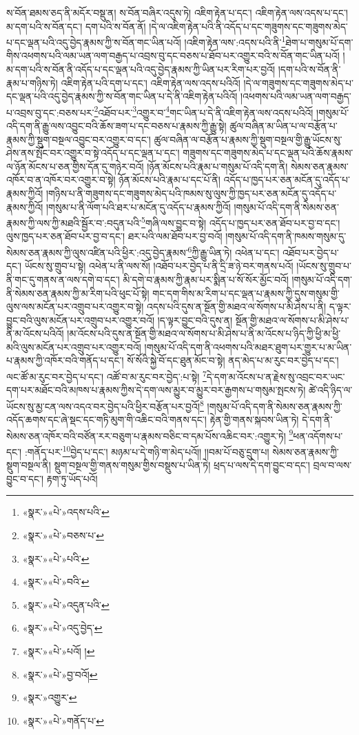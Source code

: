 ས་བོན་ཐམས་ཅད་ནི་མདོར་བསྡུ་ན། ས་བོན་བཞིར་འདུས་ཏེ། འཇིག་རྟེན་པ་དང་། འཇིག་རྟེན་ལས་འདས་པ་དང་། མ་དག་པའི་ས་བོན་དང་། དག་པའི་ས་བོན་ནོ། །དེ་ལ་འཇིག་རྟེན་པའི་ནི་འདོད་པ་དང་གཟུགས་དང་གཟུགས་མེད་པ་དང་ལྡན་པའི་འདུ་བྱེད་རྣམས་ཀྱི་ས་བོན་གང་ཡིན་པའོ། །འཇིག་རྟེན་ལས་:འདས་པའི་ནི་\footnote{«སྣར་»«པེ་»འདས་པའི་}ཐེག་པ་གསུམ་པོ་དག་གིས་འཕགས་པའི་ལམ་ཡན་ལག་བརྒྱད་པ་འབྲས་བུ་དང་བཅས་པ་ཐོབ་པར་འགྱུར་བའི་ས་བོན་གང་ཡིན་པའོ། །མ་དག་པའི་ས་བོན་ནི་འདོད་པ་དང་ལྡན་པའི་འདུ་བྱེད་རྣམས་ཀྱི་ཡིན་པར་རིག་པར་བྱའོ། །དག་པའི་ས་བོན་ནི་རྣམ་པ་གཉིས་ཏེ། འཇིག་རྟེན་པའི་དག་པ་དང་། འཇིག་རྟེན་ལས་འདས་པའིའོ། །དེ་ལ་གཟུགས་དང་གཟུགས་མེད་པ་དང་ལྡན་པའི་འདུ་བྱེད་རྣམས་ཀྱི་ས་བོན་གང་ཡིན་པ་དེ་ནི་འཇིག་རྟེན་པའིའོ། །འཕགས་པའི་ལམ་ཡན་ལག་བརྒྱད་པ་འབྲས་བུ་དང་:བཅས་པར་\footnote{«སྣར་»«པེ་»བཅས་པ་}འཐོབ་པར་\footnote{«སྣར་»«པེ་»པའི་}འགྱུར་བ་\footnote{«སྣར་»«པེ་»བའི་}གང་ཡིན་པ་དེ་ནི་འཇིག་རྟེན་ལས་འདས་པའིའོ། །གསུམ་པོ་འདི་དག་ནི་རྒྱུ་ལས་འབྱུང་བའི་ཆོས་ཟག་པ་དང་བཅས་པ་རྣམས་ཀྱི་རྒྱུ་སྟེ། ཚུལ་བཞིན་མ་ཡིན་པ་ལ་བརྩོན་པ་རྣམས་ཀྱི་སྡུག་བསྔལ་འབྱུང་བར་འགྱུར་བ་དང་། ཚུལ་བཞིན་ལ་བརྩོན་པ་རྣམས་ཀྱི་སྡུག་བསྔལ་གྱི་རྒྱུ་ཡོངས་སུ་ཤེས་ནས་སྤོང་བར་འགྱུར་བ་སྟེ་འདོད་པ་དང་ལྡན་པ་དང་། གཟུགས་དང་གཟུགས་མེད་པ་དང་ལྡན་པའི་ཆོས་རྣམས་ལ་ཉོན་མོངས་པ་ཅན་གྱིས་དོན་དུ་གཉེར་བའོ། །ཉོན་མོངས་པའི་རྣམ་པ་གསུམ་པོ་འདི་དག་ནི། སེམས་ཅན་རྣམས་འཁོར་བ་ན་འཁོར་བར་འགྱུར་བ་སྟེ། ཉོན་མོངས་པའི་རྣམ་པ་དང་པོ་ནི། འདོད་པ་ཁྱད་པར་ཅན་མངོན་དུ་འདོད་པ་རྣམས་ཀྱིའོ། །གཉིས་པ་ནི་གཟུགས་དང་གཟུགས་མེད་པའི་ཁམས་སུ་ལུས་ཀྱི་ཁྱད་པར་ཅན་མངོན་དུ་འདོད་པ་རྣམས་ཀྱིའོ། །གསུམ་པ་ནི་ལོག་པའི་ཐར་པ་མངོན་དུ་འདོད་པ་རྣམས་ཀྱིའོ། །གསུམ་པོ་འདི་དག་ནི་སེམས་ཅན་རྣམས་ཀྱི་ལས་ཀྱི་མཐའི་སྦྱོར་བ་:བདུན་པའི་\footnote{«སྣར་»«པེ་»འདུན་པའི་}གཞི་ལས་བྱུང་བ་སྟེ། འདོད་པ་ཁྱད་པར་ཅན་ཐོབ་པར་བྱ་བ་དང་། ལུས་ཁྱད་པར་ཅན་ཐོབ་པར་བྱ་བ་དང་། ཐར་པའི་ལམ་ཐོབ་པར་བྱ་བའོ། །གསུམ་པོ་འདི་དག་ནི་ཁམས་གསུམ་དུ་སེམས་ཅན་རྣམས་ཀྱི་ལུས་འཛིན་པའི་ཕྱིར་:འདུ་བྱེད་རྣམས་\footnote{«སྣར་»«པེ་»འདུ་བྱེད་}ཀྱི་རྒྱུ་ཡིན་ཏེ། འཕེན་པ་དང་། འཐོབ་པར་བྱེད་པ་དང་། ཡོངས་སུ་གྲུབ་པ་སྟེ། འཕེན་པ་ནི་ལས་སོ། །འཐོབ་པར་བྱེད་པ་ནི་དྲི་ཟ་ཉེ་བར་གནས་པའོ། །ཡོངས་སུ་གྲུབ་པ་ནི་གང་དུ་གནས་ན་ལས་དགེ་བ་དང་། མི་དགེ་བ་རྣམས་ཀྱི་རྣམ་པར་སྨིན་པ་སོ་སོར་མྱོང་བའོ། །གསུམ་པོ་འདི་དག་ནི་སེམས་ཅན་རྣམས་ཀྱི་མ་རིག་པའི་ཕུང་པོ་སྟེ། གང་དག་གིས་མ་རིག་པ་དང་ལྡན་པ་རྣམས་ཀྱི་དུས་གསུམ་གྱི་ལུས་ལས་མངོན་པར་འགྲུབ་པར་འགྱུར་བ་སྟེ། འདས་པའི་དུས་ན་སྔོན་གྱི་མཐའ་ལ་སོགས་པ་མི་ཤེས་པ་ནི། ད་ལྟར་བྱུང་བའི་ལུས་མངོན་པར་འགྲུབ་པར་འགྱུར་བའོ། །ད་ལྟར་བྱུང་བའི་དུས་ན། སྔོན་གྱི་མཐའ་ལ་སོགས་པ་མི་ཤེས་པ་ནི་མ་འོངས་པའིའོ། །མ་འོངས་པའི་དུས་ན་སྔོན་གྱི་མཐའ་ལ་སོགས་པ་མི་ཤེས་པ་ནི་མ་འོངས་པ་ཉིད་ཀྱི་ཕྱི་མ་ཕྱི་མའི་ལུས་མངོན་པར་འགྲུབ་པར་འགྱུར་བའོ། །གསུམ་པོ་འདི་དག་ནི་འཕགས་པའི་མཐར་ཐུག་པར་གྱུར་པ་མ་ཡིན་པ་རྣམས་ཀྱི་འཁོར་བའི་གནོད་པ་དང་། སོ་སོའི་སྐྱེ་བོ་དང་ཐུན་མོང་བ་སྟེ། ནད་མེད་པ་མ་རུང་བར་བྱེད་པ་དང་། ལང་ཚོ་མ་རུང་བར་བྱེད་པ་དང་། འཚོ་བ་མ་རུང་བར་བྱེད་:པ་སྟེ། \footnote{«སྣར་»«པེ་»པའོ། ། }དེ་དག་མ་འོངས་པ་ན་རྗེས་སུ་འབྲང་བར་ཡང་དག་པར་མཐོང་བའི་མཁས་པ་རྣམས་ཀྱིས་དེ་དག་ལས་མྱུར་བ་མྱུར་བར་རྒྱགས་པ་གསུམ་སྤངས་ཏེ། ཚེ་འདི་ཉིད་ལ་ཡོངས་སུ་མྱ་ངན་ལས་འདའ་བར་བྱེད་པའི་ཕྱིར་བརྩོན་པར་བྱའོ།\footnote{«སྣར་»«པེ་»བྱ་བའོ།} །གསུམ་པོ་འདི་དག་ནི་སེམས་ཅན་རྣམས་ཀྱི་འདོད་ཆགས་དང་ཞེ་སྡང་དང་གཏི་མུག་གི་འཆིང་བའི་གནས་དང་། རྟེན་གྱི་གནས་སྐབས་ཡིན་ཏེ། དེ་དག་ནི་སེམས་ཅན་འཁོར་བའི་བཙོན་རར་བཅུག་པ་རྣམས་བཅིང་བ་དམ་པོས་འཆིང་བར་:འགྱུར་ཏེ། \footnote{«སྣར་»འགྱུར་}ཕན་འདོགས་པ་དང་། :གནོད་པར་\footnote{«སྣར་»«པེ་»གནོད་པ་}བྱེད་པ་དང་། མཉམ་པ་དེ་གཉི་ག་མེད་པའོ།། །།བམ་པོ་བཅུ་དྲུག་པ། སེམས་ཅན་རྣམས་ཀྱི་སྡུག་བསྔལ་ནི། སྡུག་བསྔལ་གྱི་གནས་གསུམ་གྱིས་བསྡུས་པ་ཡིན་ཏེ། ཕྲད་པ་ལས་དེ་དག་བྱུང་བ་དང་། བྲལ་བ་ལས་བྱུང་བ་དང་། རྟག་ཏུ་ཡོད་པའོ། 
